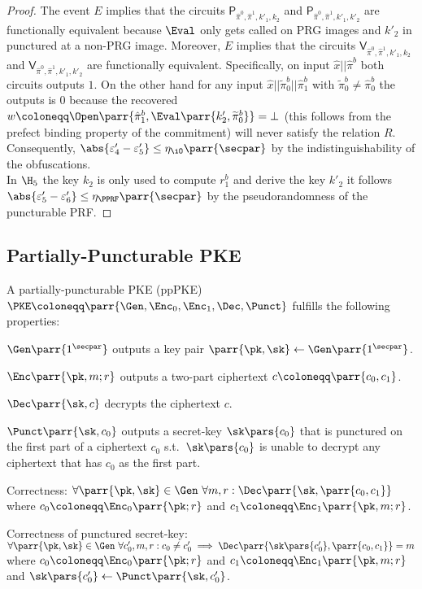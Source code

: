 \begin{proof}
    The event \(E\) implies that the circuits \(\mathsf{P}_{\hat{\pi}^0,\hat{\pi}^1,k'_1,k_2}\) and \(\mathsf{P}_{\hat{\pi}^0,\hat{\pi}^1,k'_1,k'_2}\) are functionally equivalent because \(\Eval\) only gets called on PRG images and \(k'_2\) in punctured at a non-PRG image.
    Moreover, \(E\) implies that the circuits \(\mathsf{V}_{\hat{\pi}^0,\hat{\pi}^1,k'_1,k_2}\) and \(\mathsf{V}_{\hat{\pi}^0,\hat{\pi}^1,k'_1,k'_2}\) are functionally equivalent.
    Specifically, on input \(\hat{x}||\hat{\pi}^b\) both circuits outputs \(1\).
    On the other hand for any input \(\hat{x}||\widetilde{\pi}_0^b||\hat{\pi}_1^b\) with \(\widetilde{\pi}_0^b \neq \hat{\pi}_0^b\) the outputs is \(0\) because the recovered \(w \coloneqq \Open\parr{\hat{\pi}_1^b, \Eval\parr{k'_2,\widetilde{\pi}_0^b}} = \bot\) (this follows from the prefect binding property of the commitment) will never satisfy the relation \(R\).
    Consequently, \(\abs{\varepsilon'_4 - \varepsilon'_5} \leq \eta_{\iO}\parr{\secpar}\) by the indistinguishability of the obfuscations.
    \\
    In \(\H_5\) the key \(k_2\) is only used to compute \(r_1^b\) and derive the key \(k'_2\) it follows \(\abs{\varepsilon'_5 - \varepsilon'_6} \leq \eta_{\PPRF}\parr{\secpar}\) by the pseudorandomness of the puncturable PRF.
\end{proof}


\subsection{Partially-Puncturable PKE}

\begin{definition}
    A partially-puncturable PKE (ppPKE) \(\PKE \coloneqq \parr{\Gen, \Enc_0, \Enc_1, \Dec, \Punct}\) fulfills the following properties:
    \begin{sitemize}
        \item \(\Gen\parr{1^\secpar}\) outputs a key pair \(\parr{\pk,\sk} \gets \Gen\parr{1^\secpar}\).
        \item \(\Enc\parr{\pk,m;r}\) outputs a two-part ciphertext \(c \coloneqq \parr{c_0,c_1}\).
        \item \(\Dec\parr{\sk,c}\) decrypts the ciphertext \(c\).
        \item \(\Punct\parr{\sk,c_0}\) outputs a secret-key \(\sk\pars{c_0}\) that is punctured on the first part of a ciphertext \(c_0\) s.t.\ \(\sk\pars{c_0}\) is unable to decrypt any ciphertext that has \(c_0\) as the first part.
        \item Correctness:
        \(\forall \parr{\pk,\sk} \in \Gen\ \forall m,r : \Dec\parr{\sk,\parr{c_0,c_1}}\) where \(c_0 \coloneqq \Enc_0\parr{\pk;r}\) and \(c_1 \coloneqq \Enc_1\parr{\pk,m;r}\).
        \item Correctness of punctured secret-key:
        \(\forall \parr{\pk,\sk} \in \Gen\ \forall c'_0,m,r : c_0 \neq c'_0 \implies \Dec\parr{\sk\pars{c'_0},\parr{c_0,c_1}} = m\) where \(c_0 \coloneqq \Enc_0\parr{\pk;r}\) and \(c_1 \coloneqq \Enc_1\parr{\pk,m;r}\) and \(\sk\pars{c'_0} \gets \Punct\parr{\sk,c'_0}\).
    \end{sitemize}
\end{definition}

